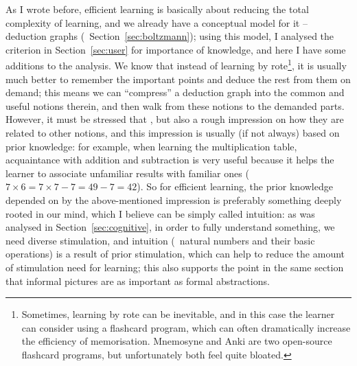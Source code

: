 As I wrote before, efficient learning is basically about reducing the total
complexity of learning, and we already have a conceptual model for it --
deduction graphs (\cf~Section~\ref{sec:boltzmann}); using this model, I
analysed the criterion in Section~\ref{sec:user} for importance of knowledge,
and here I have some additions to the analysis.  We know that instead of
learning by rote\footnote{Sometimes, learning by rote can be inevitable, and in
this case the learner can consider using a flashcard program, which can often
dramatically increase the efficiency of memorisation.  Mnemosyne and Anki are
two open-source flashcard programs, but unfortunately both feel quite bloated.},
it is usually much better to remember the important points and deduce the rest
from them on demand; this means we can ``compress'' a deduction graph into the
common and useful notions therein, and then walk from these notions to the
demanded parts.  However, it must be stressed that , but also a rough impression on how they are
related to other notions, and this impression is usually (if not always) based
on prior knowledge: for example, when learning the multiplication table,
acquaintance with addition and subtraction is very useful because it helps the
learner to associate unfamiliar results with familiar ones (\eg~$7 \times 6 =
7 \times 7 - 7 = 49 - 7 = 42$).  So for efficient learning, the prior knowledge
depended on by the above-mentioned impression is preferably something deeply
rooted in our mind, which I believe can be simply called intuition: as was
analysed in Section~\ref{sec:cognitive}, in order to fully understand something,
we need diverse stimulation, and intuition (\eg~natural numbers and their basic
operations) is a result of prior stimulation, which can help to reduce the
amount of stimulation need for learning; this also supports the point in the
same section that informal pictures are as important as formal abstractions.

